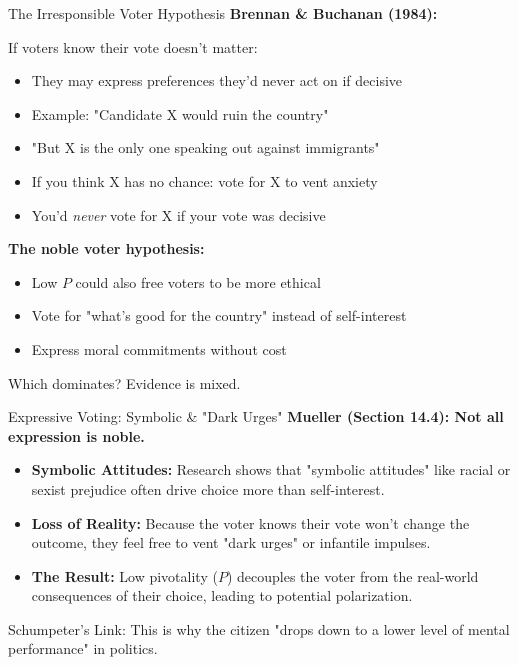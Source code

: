 \documentclass[10pt]{beamer}
\begin{document}
\begin{frame}{The Irresponsible Voter Hypothesis}
\textbf{Brennan \& Buchanan (1984):}


If voters know their vote doesn't matter:
\begin{itemize}
\item They may express preferences they'd never act on if decisive
\item Example: "Candidate X would ruin the country"
\item "But X is the only one speaking out against immigrants"
\item If you think X has no chance: vote for X to vent anxiety
\item You'd \emph{never} vote for X if your vote was decisive
\end{itemize}


\textbf{The noble voter hypothesis:}
\begin{itemize}
\item Low $P$ could also free voters to be more ethical
\item Vote for "what's good for the country" instead of self-interest
\item Express moral commitments without cost
\end{itemize}


Which dominates? Evidence is mixed.
\end{frame}


\begin{frame}{Expressive Voting: Symbolic \& "Dark Urges"}
\textbf{Mueller (Section 14.4): Not all expression is noble.}

\begin{itemize}
\item \textbf{Symbolic Attitudes:} Research shows that "symbolic attitudes" like racial or sexist prejudice often drive choice more than self-interest.
\item \textbf{Loss of Reality:} Because the voter knows their vote won't change the outcome, they feel free to vent "dark urges" or infantile impulses.
\item \textbf{The Result:} Low pivotality ($P$) decouples the voter from the real-world consequences of their choice, leading to potential polarization.
\end{itemize}


\alert{Schumpeter's Link:} This is why the citizen "drops down to a lower level of mental performance" in politics.
\end{frame}
\end{document}
